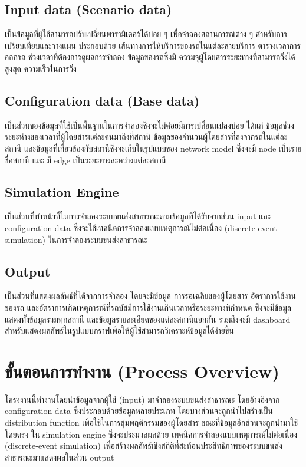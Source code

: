 \subsection{Input data (Scenario data)}
\begin{mypara}
  \indent เป็นข้อมูลที่ผู้ใช้สามารถปรับเปลี่ยนพารามิเตอร์ได้บ่อย ๆ เพื่อจำลองสถานการณ์ต่าง ๆ 
  สำหรับการเปรียบเทียบและวางแผน ประกอบด้วย เส้นทางการให้บริการของรถในแต่ละสายบริการ 
  ตารางเวลาการออกรถ ช่วงเวลาที่ต้องการดูผลการจําลอง ข้อมูลของรถซึ่งมี 
  ความจุผู้โดยสารระยะทางที่สามารถวิ่งได้สูงสุด ความเร็วในการวิ่ง
\end{mypara}
\subsection{Configuration data (Base data)}
\begin{mypara}
  \indent เป็นส่วนของข้อมูลที่ใช้เป็นพื้นฐานในการจำลองซึ่งจะไม่ค่อยมีการเปลี่ยนแปลงบ่อย 
  ได้แก่ ข้อมูลช่วงระยะห่างของเวลาที่ผู้โดยสารแต่ละคนมาถึงที่สถานี ข้อมูลของจำนวนผู้โดยสารที่ลงจากรถในแต่ละสถานี 
  และข้อมูลที่เกี่ยวข้องกับสถานีซึ่งจะเก็บในรูปแบบของ network model ซึ่งจะมี 
  node เป็นรายชื่อสถานี และ มี edge เป็นระยะทางละหว่างแต่ละสถานี
  \end{mypara}
\subsection{Simulation Engine}
\begin{mypara}
  \indent เป็นส่วนที่ทำหน้าที่ในการจำลองระบบขนส่งสาธารณะตามข้อมูลที่ได้รับจากส่วน input 
  และ configuration data ซึ่งจะใช้เทคนิคการจำลองแบบเหตุการณ์ไม่ต่อเนื่อง (discrete-event simulation) 
  ในการจำลองระบบขนส่งสาธารณะ 
\end{mypara}
\subsection{Output}
\begin{mypara}
  \indent เป็นส่วนที่แสดงผลลัพธ์ที่ได้จากการจำลอง โดยจะมีข้อมูล การรอเฉลี่ยของผู้โดยสาร อัตราการใช้งานของรถ 
  และอัตราการเกิดเหตุการณ์ที่รถบัสมีการใช้งานเกินเวลาหรือระยะทางที่กำหนด
  ซึ่งจะมีข้อมูลแสดงทั้งข้อมูลรวมทุกสถานี และข้อมูลรายละเอียดของแต่ละสถานีแยกกัน รวมถึงจะมี dashboard 
  สำหรับแสดงผลลัพธ์ในรูปแบบกราฟเพื่อให้ผู้ใช้สามารถวิเคราะห์ข้อมูลได้ง่ายขึ้น
\end{mypara}
\section{ ขั้นตอนการทำงาน (Process Overview)}
\begin{mypara}
    \indent โครงงานนี้ทำงานโดยนำข้อมูลจากผู้ใช้ (input) มาจำลองระบบขนส่งสาธารณะ 
    โดยอ้างอิงจาก configuration data ซึ่งประกอบด้วยข้อมูลหลายประเภท 
    โดยบางส่วนจะถูกนำไปสร้างเป็น distribution function เพื่อใช้ในการสุ่มพฤติกรรมของผู้โดยสาร 
    ขณะที่ข้อมูลอีกส่วนจะถูกนำมาใช้โดยตรง ใน simulation engine ซึ่งจะประมวลผลด้วย
    เทคนิคการจำลองแบบเหตุการณ์ไม่ต่อเนื่อง (discrete-event simulation) 
    เพื่อสร้างผลลัพธ์เชิงสถิติที่สะท้อนประสิทธิภาพของระบบขนส่งสาธารณะมาแสดงผลในส่วน output
\end{mypara}

